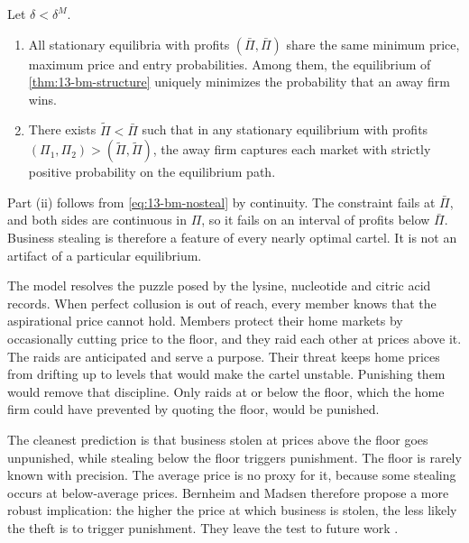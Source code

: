 \begin{theorem}\label{thm:13-bm-inevitable}
Let $\delta<\delta^M$.
\begin{enumerate}[label=(\roman*)]
\item All stationary equilibria with profits $(\bar\Pi,\bar\Pi)$ share the same minimum price, maximum price and
entry probabilities. Among them, the equilibrium of \cref{thm:13-bm-structure} uniquely minimizes the
probability that an away firm wins.
\item There exists $\tilde\Pi<\bar\Pi$ such that in any stationary equilibrium with profits
$(\Pi_1,\Pi_2)>(\tilde\Pi,\tilde\Pi)$, the away firm captures each market with strictly positive probability on
the equilibrium path.
\end{enumerate}
\end{theorem}

Part (ii) follows from \eqref{eq:13-bm-nosteal} by continuity. The constraint fails at $\bar\Pi$, and both
sides are continuous in $\Pi$, so it fails on an interval of profits below $\bar\Pi$. Business stealing is
therefore a feature of every nearly optimal cartel. It is not an artifact of a particular equilibrium.

\begin{remark}\label{rem:13-bm-puzzle}
The model resolves the puzzle posed by the lysine, nucleotide and citric acid records. When perfect collusion
is out of reach, every member knows that the aspirational price cannot hold. Members protect their home markets
by occasionally cutting price to the floor, and they raid each other at prices above it. The raids are
anticipated and serve a purpose. Their threat keeps home prices from drifting up to levels that would make the
cartel unstable. Punishing them would remove that discipline. Only raids at or below the floor, which the
home firm could have prevented by quoting the floor, would be punished.
\end{remark}

The cleanest prediction is that business stolen at prices above the floor goes unpunished, while stealing below
the floor triggers punishment. The floor is rarely known with precision. The average price is no proxy for it,
because some stealing occurs at below-average prices. Bernheim and Madsen therefore propose a more robust
implication: the higher the price at which business is stolen, the less likely the theft is to trigger
punishment. They leave the test to future work \citep[p.~7]{BernheimMadsen2017}.

